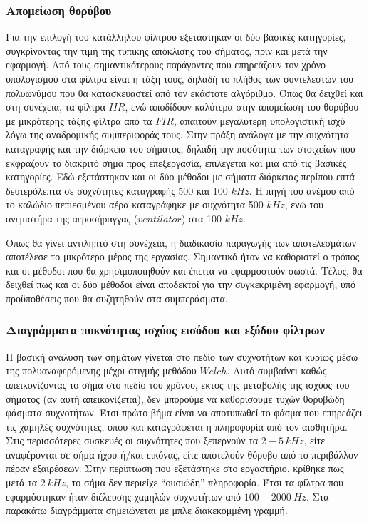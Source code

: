 \documentclass[breaklines=true, 12pt]{article}
\begin{document}
{{{\subsubsection{Απομείωση θορύβου}
\label{sec:orgf4406d7}
Για την επιλογή του κατάλληλου φίλτρου εξετάστηκαν οι δύο βασικές
κατηγορίες, συγκρίνοντας την τιμή της τυπικής απόκλισης του σήματος, πριν
και μετά την εφαρμογή.  Από τους σημαντικότερους παράγοντες
που επηρεάζουν τον χρόνο υπολογισμού στα φίλτρα είναι η τάξη τους, δηλαδή
το πλήθος των συντελεστών του πολυωνύμου που θα κατασκευαστεί από τον
εκάστοτε αλγόριθμο. Όπως θα δειχθεί και στη συνέχεια, τα φίλτρα \(IIR\), ενώ
αποδίδουν καλύτερα στην απομείωση του θορύβου με μικρότερης τάξης φίλτρα
από τα \(FIR\), απαιτούν μεγαλύτερη υπολογιστική ισχύ λόγω της αναδρομικής
συμπεριφοράς τους. Στην πράξη ανάλογα με την συχνότητα καταγραφής και
την διάρκεια του σήματος, δηλαδή την ποσότητα των στοιχείων που εκφράζουν
το διακριτό σήμα προς επεξεργασία, επιλέγεται και μια από τις βασικές
κατηγορίες. Εδώ εξετάστηκαν και οι δύο μέθοδοι με σήματα διάρκειας περίπου
επτά δευτερόλεπτα σε συχνότητες καταγραφής 500 και 100 \(kHz\). Η πηγή του
ανέμου από το καλώδιο πεπιεσμένου αέρα καταγράφηκε με συχνότητα 500 \(kHz\),
ενώ του ανεμιστήρα της αεροσήραγγας (\textbf{\(ventilator\)}) στα 100 \(kHz\).

Όπως θα γίνει αντιληπτό στη συνέχεια, η διαδικασία παραγωγής των αποτελεσμάτων
αποτέλεσε το μικρότερο μέρος της εργασίας. Σημαντικό ήταν να καθοριστεί ο
τρόπος και οι μέθοδοι που θα χρησιμοποιηθούν και έπειτα να εφαρμοστούν
σωστά. Τέλος, θα δειχθεί πως και οι δύο μέθοδοι είναι αποδεκτοί για την
συγκεκριμένη εφαρμογή, υπό προϋποθέσεις που θα συζητηθούν στα συμπεράσματα.
\subsubsection{Διαγράμματα πυκνότητας ισχύος εισόδου και εξόδου φίλτρων}
\label{sec:org25ae73a}
Η βασική ανάλυση των σημάτων γίνεται στο πεδίο των συχνοτήτων και κυρίως
μέσω της πολυαναφερόμενης μέχρι στιγμής μεθόδου \(Welch\). Αυτό συμβαίνει
καθώς απεικονίζοντας το σήμα στο πεδίο του χρόνου, εκτός της μεταβολής της
ισχύος του σήματος (αν αυτή απεικονίζεται), δεν μπορούμε να καθορίσουμε
τυχών θορυβώδη φάσματα συχνοτήτων. Έτσι πρώτο βήμα είναι να αποτυπωθεί το
φάσμα που επηρεάζει τις χαμηλές συχνότητες, όπου και καταγράφεται η
πληροφορία από τον αισθητήρα. Στις περισσότερες συσκευές οι συχνότητες
που ξεπερνούν τα \(2-5\ kHz\), είτε αναφέρονται σε σήμα ήχου ή/και εικόνας,
είτε αποτελούν θόρυβο από το περιβάλλον πέραν εξαιρέσεων. Στην περίπτωση
που εξετάστηκε στο εργαστήριο, κρίθηκε πως μετά τα \(2\ kHz\), το σήμα δεν
περιείχε “ουσιώδη” πληροφορία. Έτσι τα φίλτρα που εφαρμόστηκαν ήταν διέλευσης
χαμηλών συχνοτήτων από \(100-2000\ Hz\).  Στα παρακάτω διαγράμματα σημειώνεται
με μπλε διακεκομμένη γραμμή.

}}}
\end{document}
